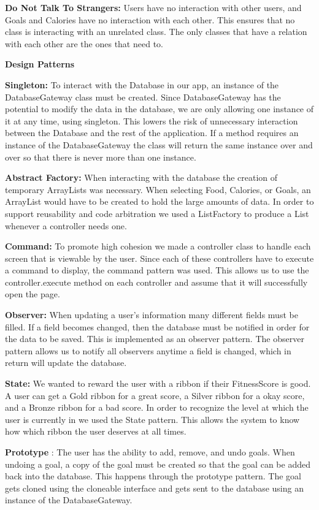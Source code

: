 \documentclass[10pt]{article}
\begin{document}
\textbf{Do Not Talk To Strangers:} Users have no interaction with other
users, and Goals and Calories have no interaction with each other. This
ensures that no class is interacting with an unrelated class. The only
classes that have a relation with each other are the ones that need to.

\textbf{Design Patterns}

\textbf{Singleton:} To interact with the Database in our app, an
instance of the DatabaseGateway class must be created. Since
DatabaseGateway has the potential to modify the data in the database, we
are only allowing one instance of it at any time, using singleton. This
lowers the risk of unnecessary interaction between the Database and the
rest of the application. If a method requires an instance of the
DatabaseGateway the class will return the same instance over and over so
that there is never more than one instance.

\textbf{Abstract Factory:} When interacting with the database the
creation of temporary ArrayLists was necessary. When selecting Food,
Calories, or Goals, an ArrayList would have to be created to hold the
large amounts of data. In order to support reusability and code
arbitration we used a ListFactory to produce a List whenever a
controller needs one.

\textbf{Command:} To promote high cohesion we made a controller class to
handle each screen that is viewable by the user. Since each of these
controllers have to execute a command to display, the command pattern
was used. This allows us to use the controller.execute method on each
controller and assume that it will successfully open the page.

\textbf{Observer:} When updating a user's information many different
fields must be filled. If a field becomes changed, then the database
must be notified in order for the data to be saved. This is implemented
as an observer pattern. The observer pattern allows us to notify all
observers anytime a field is changed, which in return will update the
database.

\textbf{State:} We wanted to reward the user with a ribbon if their
FitnessScore is good. A user can get a Gold ribbon for a great score, a
Silver ribbon for a okay score, and a Bronze ribbon for a bad score. In
order to recognize the level at which the user is currently in we used
the State pattern. This allows the system to know how which ribbon the
user deserves at all times.

\textbf{Prototype} : The user has the ability to add, remove, and undo
goals. When undoing a goal, a copy of the goal must be created so that
the goal can be added back into the database. This happens through the
prototype pattern. The goal gets cloned using the cloneable interface
and gets sent to the database using an instance of the DatabaseGateway.
\end{document}
